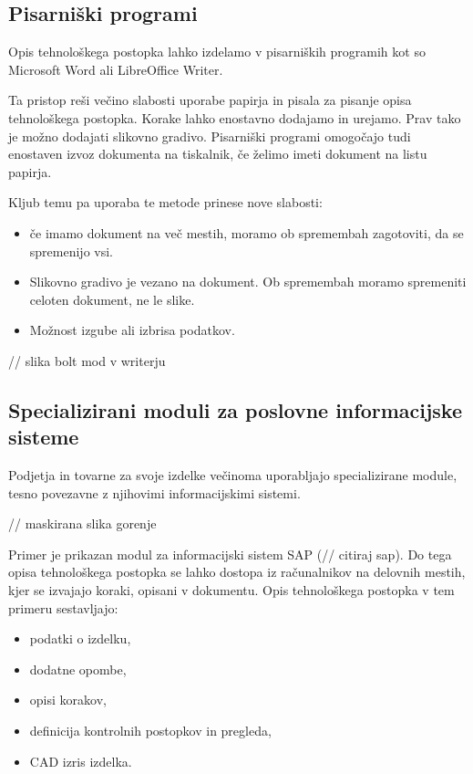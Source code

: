 \documentclass[a4paper, 12pt]{book}
\begin{document}
\subsection{Pisarniški programi}

Opis tehnološkega postopka lahko izdelamo v pisarniških programih kot so Microsoft Word ali LibreOffice Writer.

Ta pristop reši večino slabosti uporabe papirja in pisala za pisanje opisa tehnološkega postopka.
Korake lahko enostavno dodajamo in urejamo.
Prav tako je možno dodajati slikovno gradivo.
Pisarniški programi omogočajo tudi enostaven izvoz dokumenta na tiskalnik, če želimo imeti dokument na listu papirja.

Kljub temu pa uporaba te metode prinese nove slabosti:
\begin{itemize}
	\item če imamo dokument na več mestih, moramo ob spremembah zagotoviti, da se spremenijo vsi.
	\item Slikovno gradivo je vezano na dokument. Ob spremembah moramo spremeniti celoten dokument, ne le slike.
	\item Možnost izgube ali izbrisa podatkov.
\end{itemize}

// slika bolt mod v writerju

\subsection{Specializirani moduli za poslovne informacijske sisteme}

Podjetja in tovarne za svoje izdelke večinoma uporabljajo specializirane module, tesno povezavne z njihovimi informacijskimi sistemi.

// maskirana slika gorenje

Primer je prikazan modul za informacijski sistem SAP (// citiraj sap).
Do tega opisa tehnološkega postopka se lahko dostopa iz računalnikov na delovnih mestih, kjer se izvajajo koraki, opisani v dokumentu.
Opis tehnološkega postopka v tem primeru sestavljajo:
\begin{itemize}
	\item podatki o izdelku,
	\item dodatne opombe,
	\item opisi korakov,
	\item definicija kontrolnih postopkov in pregleda, 
	\item CAD izris izdelka.
\end{itemize}
\end{document}

